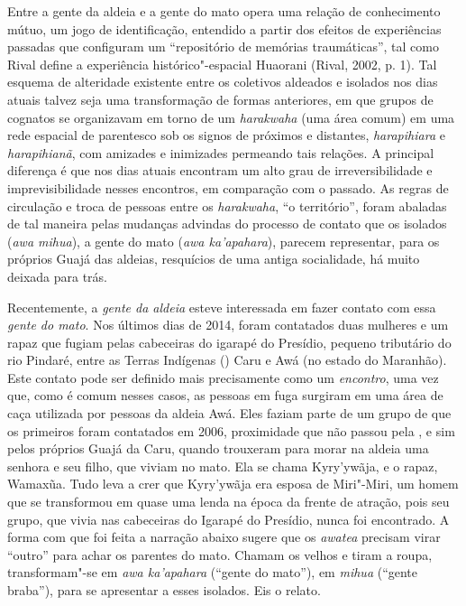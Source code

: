 Entre a gente da aldeia e a gente do mato opera uma relação de
conhecimento mútuo, um jogo de identificação, entendido a partir dos
efeitos de experiências passadas que configuram um ``repositório de
memórias traumáticas'', tal como Rival define a experiência
histórico"-espacial Huaorani (Rival, 2002, p. 1). Tal esquema de alteridade
existente entre os coletivos aldeados e isolados nos dias atuais talvez
seja uma transformação de formas anteriores, em que grupos de cognatos
se organizavam em torno de um \emph{harakwaha} (uma área comum) em uma
rede espacial de parentesco sob os signos de próximos e distantes,
\emph{harapihiara} e \emph{harapihianã}, com amizades e inimizades
permeando tais relações. A principal diferença é que nos dias atuais
encontram um alto grau de irreversibilidade e imprevisibilidade nesses
encontros, em comparação com o passado. As regras de circulação e troca
de pessoas entre os \emph{harakwaha}, ``o território'', foram abaladas de
tal maneira pelas mudanças advindas do processo de contato que os
isolados (\emph{awa mihua}), a gente do mato (\emph{awa ka'apahara}),
parecem representar, para os próprios Guajá das aldeias, resquícios de
uma antiga socialidade, há muito deixada para trás.

Recentemente, a \emph{gente da aldeia} esteve interessada em fazer
contato com essa \emph{gente do mato}. Nos últimos dias de 2014, foram
contatados duas mulheres e um rapaz que fugiam pelas cabeceiras do
igarapé do Presídio, pequeno tributário do rio Pindaré, entre as Terras
Indígenas () Caru e Awá (no estado do Maranhão). Este contato pode ser
definido mais precisamente como um \emph{encontro}, uma vez que, como é
comum nesses casos, as pessoas em fuga surgiram em uma área de caça
utilizada por pessoas da aldeia Awá. Eles faziam parte de um grupo
de que os primeiros foram contatados em 2006, proximidade que não passou
pela , e sim pelos próprios Guajá da  Caru, quando trouxeram para
morar na aldeia uma senhora e seu filho, que viviam no mato. Ela se
chama Kyry'ywãja, e o rapaz, Wamaxũa. Tudo leva a crer que Kyry'ywãja
era esposa de Miri"-Miri, um homem que se transformou em quase uma lenda
na época da frente de atração, pois seu grupo, que vivia nas cabeceiras
do Igarapé do Presídio, nunca foi encontrado. A forma com que foi feita
a narração abaixo sugere que os \emph{awatea} precisam virar ``outro''
para achar os parentes do mato. Chamam os velhos e tiram a roupa,
transformam"-se em \emph{awa ka'apahara} (``gente do mato''), em
\emph{mihua} (``gente braba''), para se apresentar a esses isolados. Eis
o relato.

